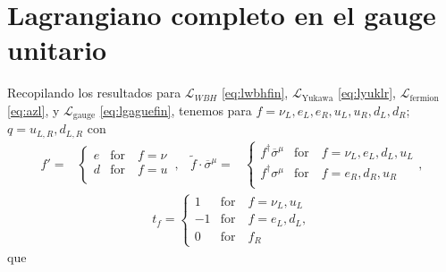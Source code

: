 \section{Lagrangiano completo en el gauge unitario}

Recopilando los resultados para $\mathcal{L}_{WBH}$
\eqref{eq:lwbhfin}, $\mathcal{L}_{\text{Yukawa}}$ \eqref{eq:lyuklr},
$\mathcal{L}_{\text{fermion}}$ \eqref{eq:azl}, y
$\mathcal{L}_{\text{gauge}}$ \eqref{eq:lgaguefin}, tenemos para
$f=\nu_L,e_L,e_R,u_L,u_R,d_L,d_R$; $q=u_{L,R},d_{L,R}$ con
\begin{align}
f'=&
\begin{cases}
  e &\text{for}\quad f=\nu\\
  d &\text{for}\quad f=u\\
\end{cases}\,,&
\widetilde{f}\cdot\overline{\sigma}^{\mu}=&
  \begin{cases}
    f^{\dagger}\overline{\sigma}^{\mu} & \text{for}\quad f=\nu_L,e_L,d_L,u_L\\
    f^{\dagger}{\sigma}^{\mu} & \text{for}\quad f=e_R,d_R,u_R\\
  \end{cases},
\end{align}
\begin{align}
  t_f=
  \begin{cases}
   1 & \text{for}\quad   f=\nu_L,u_L\\
   -1 & \text{for}\quad f=e_L,d_L,\\
   0 & \text{for}\quad f_R
  \end{cases}
\end{align}
que

